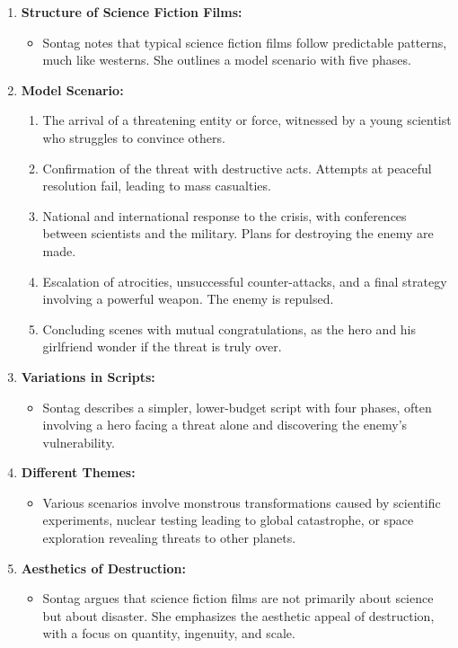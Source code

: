 \documentclass[11pt,fleqn]{book} %
\begin{document}
\begin{enumerate}[label=\arabic*.]
    \item \textbf{Structure of Science Fiction Films:}
    \begin{itemize}
        \item Sontag notes that typical science fiction films follow predictable patterns, much like westerns. She outlines a model scenario with five phases.
    \end{itemize}

    \item \textbf{Model Scenario:}
    \begin{enumerate}[label=(\roman*)]
        \item The arrival of a threatening entity or force, witnessed by a young scientist who struggles to convince others.
        \item Confirmation of the threat with destructive acts. Attempts at peaceful resolution fail, leading to mass casualties.
        \item National and international response to the crisis, with conferences between scientists and the military. Plans for destroying the enemy are made.
        \item Escalation of atrocities, unsuccessful counter-attacks, and a final strategy involving a powerful weapon. The enemy is repulsed.
        \item Concluding scenes with mutual congratulations, as the hero and his girlfriend wonder if the threat is truly over.
    \end{enumerate}

    \item \textbf{Variations in Scripts:}
    \begin{itemize}
        \item Sontag describes a simpler, lower-budget script with four phases, often involving a hero facing a threat alone and discovering the enemy's vulnerability.
    \end{itemize}

    \item \textbf{Different Themes:}
    \begin{itemize}
        \item Various scenarios involve monstrous transformations caused by scientific experiments, nuclear testing leading to global catastrophe, or space exploration revealing threats to other planets.
    \end{itemize}

    \item \textbf{Aesthetics of Destruction:}
    \begin{itemize}
        \item Sontag argues that science fiction films are not primarily about science but about disaster. She emphasizes the aesthetic appeal of destruction, with a focus on quantity, ingenuity, and scale.
    \end{itemize}


\end{enumerate}
\end{document}
